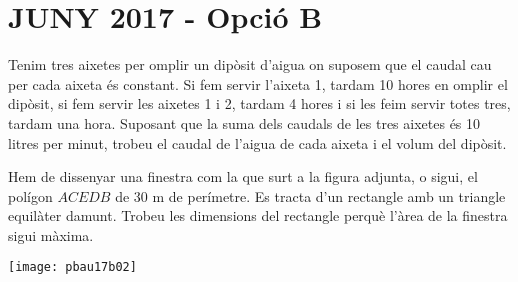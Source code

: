 \documentclass[11pt, a4paper, pdf]{book}
\begin{document}
\section*{JUNY 2017 - Opció B} 
\setcounter{myenumi}{0}
\begin{mylist}

\item Tenim tres aixetes per omplir un dipòsit d'aigua on suposem que el caudal cau per cada aixeta és constant. Si fem servir l'aixeta 1, tardam 10 hores en omplir el dipòsit, si fem servir les aixetes 1 i 2, tardam 4 hores i si les feim servir totes tres, tardam una hora.
Suposant que la suma dels caudals de les tres aixetes és 10 litres per minut, trobeu el caudal de l'aigua de cada aixeta i el volum del dipòsit.


\vspace{-2cm}
\item \begin{minipage}[t]{0.7\textwidth}
	Hem de dissenyar una finestra com la que surt a la figura adjunta, o sigui, el polígon $ACEDB$ de 30 m de perímetre. Es tracta d'un rectangle amb un triangle equilàter damunt. Trobeu les dimensions del rectangle perquè l'àrea de la finestra sigui màxima.
	
\end{minipage}
\begin{minipage}{0.3\textwidth}
	\centering
	\vspace{1.5cm}
	\texttt{[image: pbau17b02]}
\end{minipage}
 
\end{mylist}
\end{document}
